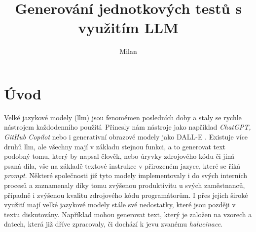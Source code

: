 \documentclass[czech, ma, kiv, he, iso690numb, pdf, viewonly]{fasthesis}
\title{Generování jednotkových testů s využitím LLM}
\author{Milan}{Horínek}{Bc.}{}
\begin{document}
\frontpages[tm] %
\tableofcontents
% 
%
\makeatletter%
\ifx\FASThesis@style\c@fullcolor%
\else%
\fi%
\makeatother%

\setlength{\parskip}{1em}


\chapter{Úvod}

    Velké jazykové modely (\Gls{llm}) jsou fenomémen posledních doby a staly se rychle nástrojem každodenního použití. Přinesly nám nástroje jako například \textit{ChatGPT, GitHub Copilot} nebo i generativní obrazové modely jako DALL-E \cite{ramesh2022hierarchical}. Existuje více druhů \Gls{llm}, ale všechny mají v základu stejnou funkci, a to generovat text podobný tomu, který by napsal člověk, nebo úryvky zdrojového kódu či jiná psaná díla, vše na základě textové instrukce v přirozeném jazyce, které se říká \textit{prompt}. Některé společnosti již tyto modely implementovaly i do svých interních procesů a zaznamenaly díky tomu zvýšenou produktivitu u svých zaměstnanců, případně i zvýšenou kvalitu zdrojového kódu programátorům. \cite{chatterjee2024impact} I přes jejich široké využití mají velké jazykové modely stále své nedostatky, které jsou později v textu diskutovány. Například mohou generovat text, který je založen na vzorech a datech, která již dříve zpracovaly, či dochází k jevu zvanému \textit{halucinace}. 
\end{document}
